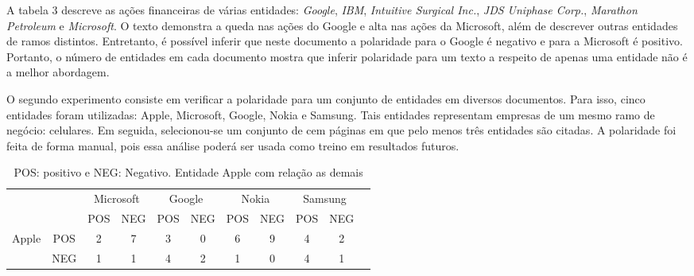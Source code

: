 \documentclass[a4paper,12pt]{article}
\begin{document}
A tabela 3 descreve as ações financeiras de várias entidades: \textit{Google}, \textit{IBM}, \textit{Intuitive Surgical Inc.}, \textit{JDS Uniphase Corp.}, \textit{Marathon Petroleum} e \textit{Microsoft}. O texto demonstra a queda nas ações do Google e alta nas ações da Microsoft, além de descrever outras entidades de ramos distintos. Entretanto, é possível inferir que neste documento a polaridade para o Google é negativo e para a Microsoft é positivo. Portanto, o número de entidades em cada documento mostra que inferir polaridade para um texto a respeito de apenas uma entidade não é a melhor abordagem. 

O segundo experimento consiste em verificar a polaridade para um conjunto de entidades em diversos documentos. Para isso, cinco entidades foram utilizadas: Apple, Microsoft, Google, Nokia e Samsung. Tais entidades representam empresas de um mesmo ramo de negócio: celulares. Em seguida, selecionou-se um conjunto de cem páginas em que pelo menos três entidades são citadas. A polaridade foi feita de forma manual, pois essa análise poderá ser usada como treino em resultados futuros.

\begin{table}
\begin{center}
	\begin{tabular}{cc|c|c|c|c|c|c|c|c|l}
	\cline{3-10}
	& & \multicolumn{2}{|c|}{Microsoft} & \multicolumn{2}{|c|}{Google} & \multicolumn{2}{|c|}{Nokia} & \multicolumn{2}{|c|}{Samsung} \\ \cline{3-10}
	& & \multicolumn{1}{|c|}{POS} & \multicolumn{1}{|c|}{NEG} & \multicolumn{1}{|c|}{POS} & \multicolumn{1}{|c|}{NEG} & \multicolumn{1}{|c|}{POS} & \multicolumn{1}{|c|}{NEG} & \multicolumn{1}{|c|}{POS} & \multicolumn{1}{|c|}{NEG} \\ \cline{1-10}
	\multicolumn{1}{|c|}{\multirow{2}{*}{Apple}} &
	\multicolumn{1}{|c|}{POS} & 2 & 7 & 3 & 0 & 6 & 9 & 4 & 2  \\ \cline{2-10}
	\multicolumn{1}{|c|}{}                        &
	\multicolumn{1}{|c|}{NEG} & 1 & 1 & 4 & 2 & 1 & 0 & 4  & 1   \\ \cline{1-10}
	\end{tabular}
  \caption{POS: positivo e NEG: Negativo. Entidade Apple com relação as demais}
\end{center}
\end{table}
\end{document}
